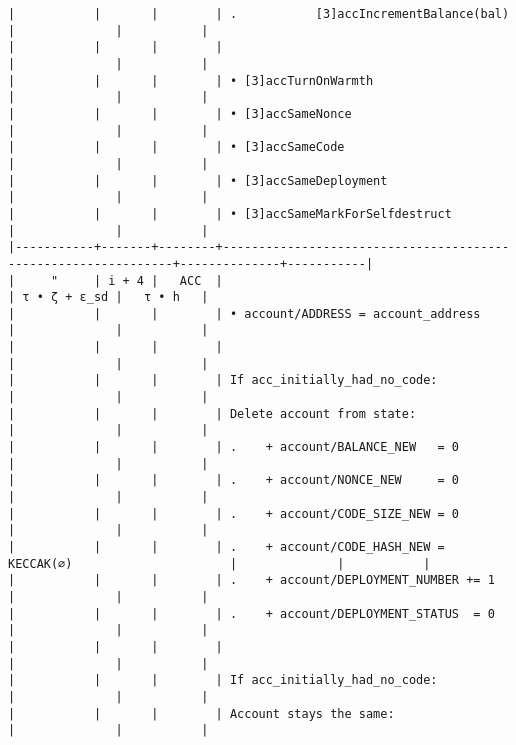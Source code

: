 \documentclass[varwidth=\maxdimen,margin=0.5cm,multi={verbatim}]{standalone}
\begin{document}
\begin{verbatim}
|           |       |        | .           [3]accIncrementBalance(bal)                       |              |           |
|           |       |        |                                                               |              |           |
|           |       |        | • [3]accTurnOnWarmth                                          |              |           |
|           |       |        | • [3]accSameNonce                                             |              |           |
|           |       |        | • [3]accSameCode                                              |              |           |
|           |       |        | • [3]accSameDeployment                                        |              |           |
|           |       |        | • [3]accSameMarkForSelfdestruct                               |              |           |
|-----------+-------+--------+---------------------------------------------------------------+--------------+-----------|
|     "     | i + 4 |   ACC  |                                                               | τ • ζ + ε_sd |   τ • h   |
|           |       |        | • account/ADDRESS = account_address                           |              |           |
|           |       |        |                                                               |              |           |
|           |       |        | If acc_initially_had_no_code:                                 |              |           |
|           |       |        | Delete account from state:                                    |              |           |
|           |       |        | .    + account/BALANCE_NEW   = 0                              |              |           |
|           |       |        | .    + account/NONCE_NEW     = 0                              |              |           |
|           |       |        | .    + account/CODE_SIZE_NEW = 0                              |              |           |
|           |       |        | .    + account/CODE_HASH_NEW = KECCAK(∅)                      |              |           |
|           |       |        | .    + account/DEPLOYMENT_NUMBER += 1                         |              |           |
|           |       |        | .    + account/DEPLOYMENT_STATUS  = 0                         |              |           |
|           |       |        |                                                               |              |           |
|           |       |        | If acc_initially_had_no_code:                                 |              |           |
|           |       |        | Account stays the same:                                       |              |           |

\end{verbatim}
\end{document}
